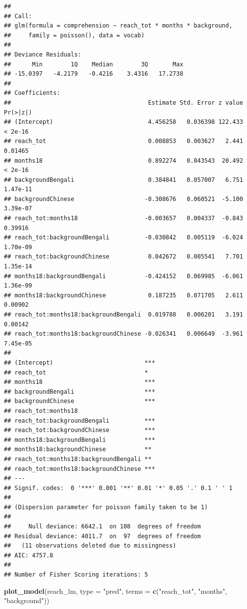 \documentclass[]{article}
\newenvironment{Shaded}{\begin{snugshade}}{\end{snugshade}}
\newcommand{\DataTypeTok}[1]{\textcolor[rgb]{0.13,0.29,0.53}{#1}}
\newcommand{\KeywordTok}[1]{\textcolor[rgb]{0.13,0.29,0.53}{\textbf{#1}}}
\newcommand{\NormalTok}[1]{#1}
\newcommand{\StringTok}[1]{\textcolor[rgb]{0.31,0.60,0.02}{#1}}
\begin{document}
\begin{verbatim}
## 
## Call:
## glm(formula = comprehension ~ reach_tot * months * background, 
##     family = poisson(), data = vocab)
## 
## Deviance Residuals: 
##      Min        1Q    Median        3Q       Max  
## -15.0397   -4.2179   -0.4216    3.4316   17.2738  
## 
## Coefficients:
##                                       Estimate Std. Error z value Pr(>|z|)
## (Intercept)                           4.456258   0.036398 122.433  < 2e-16
## reach_tot                             0.008853   0.003627   2.441  0.01465
## months18                              0.892274   0.043543  20.492  < 2e-16
## backgroundBengali                     0.384841   0.057007   6.751 1.47e-11
## backgroundChinese                    -0.308676   0.060521  -5.100 3.39e-07
## reach_tot:months18                   -0.003657   0.004337  -0.843  0.39916
## reach_tot:backgroundBengali          -0.030842   0.005119  -6.024 1.70e-09
## reach_tot:backgroundChinese           0.042672   0.005541   7.701 1.35e-14
## months18:backgroundBengali           -0.424152   0.069985  -6.061 1.36e-09
## months18:backgroundChinese            0.187235   0.071705   2.611  0.00902
## reach_tot:months18:backgroundBengali  0.019788   0.006201   3.191  0.00142
## reach_tot:months18:backgroundChinese -0.026341   0.006649  -3.961 7.45e-05
##                                         
## (Intercept)                          ***
## reach_tot                            *  
## months18                             ***
## backgroundBengali                    ***
## backgroundChinese                    ***
## reach_tot:months18                      
## reach_tot:backgroundBengali          ***
## reach_tot:backgroundChinese          ***
## months18:backgroundBengali           ***
## months18:backgroundChinese           ** 
## reach_tot:months18:backgroundBengali ** 
## reach_tot:months18:backgroundChinese ***
## ---
## Signif. codes:  0 '***' 0.001 '**' 0.01 '*' 0.05 '.' 0.1 ' ' 1
## 
## (Dispersion parameter for poisson family taken to be 1)
## 
##     Null deviance: 6642.1  on 108  degrees of freedom
## Residual deviance: 4011.7  on  97  degrees of freedom
##   (11 observations deleted due to missingness)
## AIC: 4757.8
## 
## Number of Fisher Scoring iterations: 5
\end{verbatim}

\begin{Shaded}
\begin{Highlighting}[]
\KeywordTok{plot_model}\NormalTok{(reach_lm, }\DataTypeTok{type =} \StringTok{"pred"}\NormalTok{, }\DataTypeTok{terms =} \KeywordTok{c}\NormalTok{(}\StringTok{"reach_tot"}\NormalTok{, }\StringTok{"months"}\NormalTok{, }\StringTok{"background"}\NormalTok{))}
\end{Highlighting}
\end{Shaded}
\end{document}

